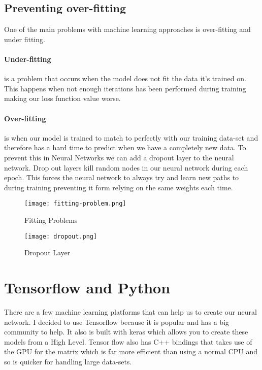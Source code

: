 \subsection{Preventing over-fitting}
One of the main problems with machine learning approaches is over-fitting and under fitting.

\paragraph{Under-fitting} is a problem that occurs when the model does not fit the data it's trained on. This happens when not enough iterations has been performed during training making our loss function value worse.

\paragraph{Over-fitting} is when our model is trained to match to perfectly with our training data-set and therefore has a hard time to predict when we have a completely new data. To prevent this in Neural Networks we can add a dropout layer to the neural network. Drop out layers kill random nodes in our neural network during each epoch. This forces the neural network to always try and learn new paths to during training preventing it form relying on the same weights each time.

\begin{figure}[ht]
    \centering
    \texttt{[image: fitting-problem.png]}
    \caption{Fitting Problems \cite{overfitting}}
    \label{fig:fittingProblems}
\end{figure}


\begin{figure}[ht]
    \centering
    \texttt{[image: dropout.png]}
    \caption{Dropout Layer \cite{dropout}}
    \label{fig:dropoutLayer}
\end{figure}
\section{Tensorflow and Python}
There are a few machine learning platforms that can help us to create our neural network. I decided to use Tensorflow because it is popular and has a big community to help. It also is built with keras which allows you to create these models from a High Level. Tensor flow also has C++ bindings that takes use of the GPU for the matrix which is far more efficient than using a normal CPU and so is quicker for handling large data-sets.

